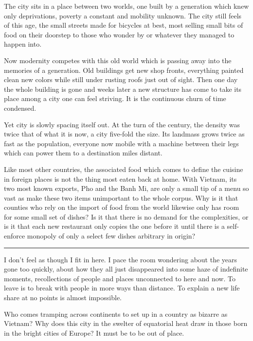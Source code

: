 \documentclass[ebook, 10pt, openright, onecolumn]{memoir}
\newcommand*\td[1]{
  \todo[inline]{
     #1 
  }
}
\newcommand*\starbreak{\fancybreak*{\Large{* * *}}}
\newcommand*\finish{\td{ ----- Finish this section -----}}
\begin{document}
The city sits in a place between two worlds, one built by a generation which
knew only deprivations, poverty a constant and mobility unknown.  The city still
feels of this age, the small streets made for bicycles at best, most selling
small bits of food on their doorstep to those who wonder by or whatever they
managed to happen into.

Now modernity competes with this old world which is passing away into the
memories of a generation.  Old buildings get new shop fronts, everything painted
clean new colors while still under rusting roofs just out of sight.  Then one
day the whole building is gone and weeks later a new structure has come to take
its place among a city one can feel striving.  It is the continuous churn of
time condensed.

Yet city is slowly spacing itself out.  At the turn of the century, the density
was twice that of what it is now, a city five-fold the size.  Its landmass grows
twice as fast as the population, everyone now mobile with a machine between
their legs which can power them to a destination miles distant.

\finish{}

Like most other countries, the associated food which comes to define the cuisine
in foreign places is not the thing most eaten back at home. With Vietnam, its
two most known exports, Pho and the Banh Mi, are only a small tip of a menu so
vast as make these two items unimportant to the whole corpus.  Why is it that
counties who rely on the import of food from the world likewise only has room
for some small set of dishes?  Is it that there is no demand for the
complexities, or is it that each new restaurant only copies the one before it
until there is a self-enforce monopoly of only a select few dishes arbitrary in
origin?

\finish


\starbreak

I don't feel as though I fit in here. I pace the room wondering about the years
gone too quickly, about how they all just disappeared into some haze of
indefinite moments, recollections of people and places unconnected to here and
now.  To leave is to break with people in more ways than distance.  To explain a
new life share at no points is almost impossible.

Who comes tramping across continents to set up in a country as bizarre as
Vietnam?  Why does this city in the swelter of equatorial heat draw in those
born in the bright cities of Europe?  It must be to be out of place.
\end{document}
